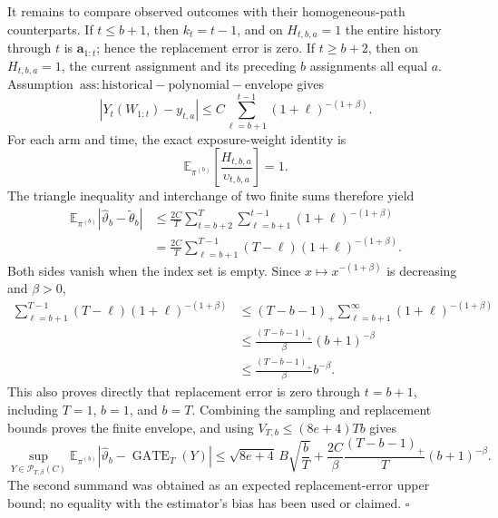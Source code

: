 It remains to compare observed outcomes with their homogeneous-path counterparts. If \(t\le b+1\), then \(k_t=t-1\), and on \(H_{t,b,a}=1\) the entire history through \(t\) is \(\mathbf a_{1:t}\); hence the replacement error is zero. If \(t\ge b+2\), then on \(H_{t,b,a}=1\), the current assignment and its preceding \(b\) assignments all equal \(a\). Assumption~\(\mathrm{ass:historical-polynomial-envelope}\) gives
\[
|Y_t(W_{1:t})-y_{t,a}|
\le C\sum_{\ell=b+1}^{t-1}(1+\ell)^{-(1+\beta)}.
\]
For each arm and time, the exact exposure-weight identity is
\[
\mathbb E_{\pi^{(b)}}\left[\frac{H_{t,b,a}}{\upsilon_{t,b,a}}\right]=1.
\]
The triangle inequality and interchange of two finite sums therefore yield
\[
\begin{aligned}
\mathbb E_{\pi^{(b)}}|\widehat\vartheta_b-\widetilde\theta_b|
&\le\frac{2C}{T}\sum_{t=b+2}^T\sum_{\ell=b+1}^{t-1}(1+\ell)^{-(1+\beta)}\\
&=\frac{2C}{T}\sum_{\ell=b+1}^{T-1}(T-\ell)(1+\ell)^{-(1+\beta)}.
\end{aligned}
\]
Both sides vanish when the index set is empty. Since \(x\mapsto x^{-(1+\beta)}\) is decreasing and \(\beta>0\),
\[
\begin{aligned}
\sum_{\ell=b+1}^{T-1}(T-\ell)(1+\ell)^{-(1+\beta)}
&\le (T-b-1)_+\sum_{\ell=b+1}^{\infty}(1+\ell)^{-(1+\beta)}\\
&\le\frac{(T-b-1)_+}{\beta}(b+1)^{-\beta}\\
&\le\frac{(T-b-1)_+}{\beta}b^{-\beta}.
\end{aligned}
\]
This also proves directly that replacement error is zero through \(t=b+1\), including \(T=1\), \(b=1\), and \(b=T\). Combining the sampling and replacement bounds proves the finite envelope, and using \(V_{T,b}\le(8e+4)Tb\) gives
\[
\sup_{Y\in\mathcal P_{T,\beta}(C)}
\mathbb E_{\pi^{(b)}}|\widehat\vartheta_b-\operatorname{GATE}_T(Y)|
\le \sqrt{8e+4}\,B\sqrt{\frac bT}
+\frac{2C}{\beta}\frac{(T-b-1)_+}{T}(b+1)^{-\beta}.
\]
The second summand was obtained as an expected replacement-error upper bound; no equality with the estimator's bias has been used or claimed. \(\square\)